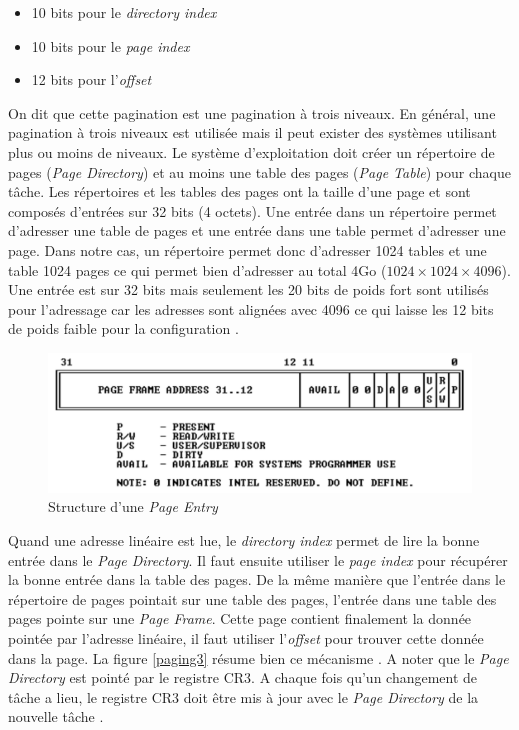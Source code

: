 \begin{itemize}[label=\textbullet]
	\item 10 bits pour le \textit{directory index}
	\item 10 bits pour le \textit{page index}
    \item 12 bits pour l'\textit{offset}
\end{itemize}

On dit que cette pagination est une pagination à trois niveaux. En général, une
pagination à trois niveaux est utilisée mais il peut exister des systèmes utilisant
plus ou moins de niveaux. Le système d'exploitation doit créer un répertoire de pages
(\textit{Page Directory}) et au moins une table des pages (\textit{Page Table}) pour
chaque tâche. Les répertoires et les tables des pages ont la taille d'une page et sont
composés d'entrées sur 32 bits (4 octets). Une entrée dans un répertoire permet
d'adresser une table de pages et une entrée dans une table permet d'adresser une page.
Dans notre cas, un répertoire permet donc d'adresser 1024 tables et une table
1024 pages ce qui permet bien d'adresser au total 4Go ($1024 \times 1024 \times 4096$).
Une entrée est sur 32 bits mais seulement les 20 bits de poids fort sont utilisés
pour l'adressage car les adresses sont alignées avec 4096 ce qui laisse les 12 bits
de poids faible pour la configuration \cite{ref21}.

\begin{figure}[!h]
  \centering
  \includegraphics[scale=0.6]{images/page_entry.png}
  \caption{Structure d'une \textit{Page Entry}}
  \label{page_entry}
\end{figure}

Quand une adresse linéaire est lue, le \textit{directory index} permet
de lire la bonne entrée dans le \textit{Page Directory}. Il faut ensuite utiliser
le \textit{page index} pour récupérer la bonne entrée dans la table des pages.
De la même manière que l'entrée dans le répertoire de pages pointait sur une table
des pages, l'entrée dans une table des pages pointe sur une \textit{Page Frame}.
Cette page contient finalement la donnée pointée par l'adresse linéaire, il faut
utiliser l'\textit{offset} pour trouver cette donnée dans la page. La figure \ref{paging3}
résume bien ce mécanisme \cite{ref66}. A noter que le \textit{Page Directory} est
pointé par le registre CR3. A chaque fois qu'un changement de tâche a lieu, le
registre CR3 doit être mis à jour avec le \textit{Page Directory} de la nouvelle
tâche \cite{ref15}.

